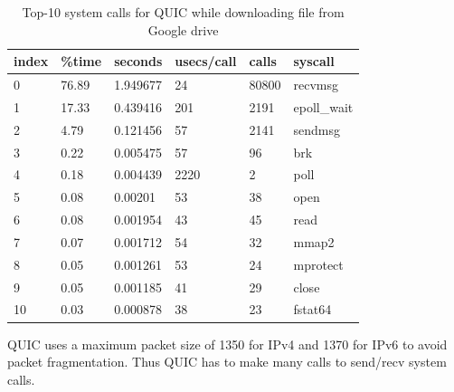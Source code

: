 \begin{frame}
\begin{table}[ht]
    \begin{tabular}{@{}|l|l|l|l|l|l|@{}}
        \toprule
        \textbf{index} & \textbf{\%time} & \textbf{seconds} & \textbf{usecs/call} & \textbf{calls} & \textbf{syscall} \\ \midrule
        0              & 76.89           & 1.949677         & 24                  & 80800          & recvmsg          \\ \midrule
        1              & 17.33           & 0.439416         & 201                 & 2191           & epoll\_wait      \\ \midrule
        2              & 4.79            & 0.121456         & 57                  & 2141           & sendmsg          \\ \midrule
        3              & 0.22            & 0.005475         & 57                  & 96             & brk              \\ \midrule
        4              & 0.18            & 0.004439         & 2220                & 2              & poll             \\ \midrule
        5              & 0.08            & 0.00201          & 53                  & 38             & open             \\ \midrule
        6              & 0.08            & 0.001954         & 43                  & 45             & read             \\ \midrule
        7              & 0.07            & 0.001712         & 54                  & 32             & mmap2            \\ \midrule
        8              & 0.05            & 0.001261         & 53                  & 24             & mprotect         \\ \midrule
        9              & 0.05            & 0.001185         & 41                  & 29             & close            \\ \midrule
        10             & 0.03            & 0.000878         & 38                  & 23             & fstat64          \\ \bottomrule
    \end{tabular}
    \caption{Top-10 system calls for QUIC while downloading file from Google drive}\label{table:top-10-system-calls}
\end{table}
QUIC uses a maximum packet size of 1350 for IPv4 and 1370 for IPv6 to avoid packet fragmentation. Thus QUIC has to make many calls to send/recv system calls.
\end{frame}
\clearpage


